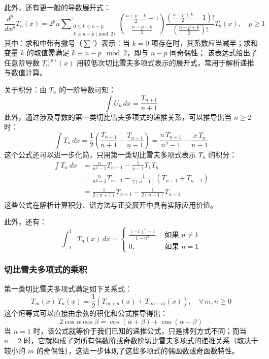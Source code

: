 此外，还有更一般的导数展开式：
$$
\frac{d^p}{dx^p} T_n(x) = 2^p n \sum\nolimits^{\prime}_{\substack{0 \leq k \leq n - p \\ k \equiv n - p \!\!\!\! \pmod{2}}}
\binom{\frac{n + p - k}{2} - 1}{\frac{n - p - k}{2}} \frac{\left( \frac{n + p + k}{2} - 1 \right)!}{\left( \frac{n - p + k}{2} \right)!} T_k(x) ,\quad p \geq 1~
$$
其中：求和中带有撇号（$\sum'$）表示：当 $k = 0$ 项存在时，其系数应当减半；求和变量 $k$ 的取值需满足 $k \equiv n - p \mod 2$，即与 $n - p$ 同奇偶性；
该表达式给出了任意阶导数 $T_n^{(p)}(x)$ 用较低次切比雪夫多项式表示的展开式，常用于解析递推与数值计算。

关于积分：由 $T_n$ 的一阶导数可知：
$$
\int U_n\, dx = \frac{T_{n+1}}{n+1}~
$$
此外，通过涉及导数的第一类切比雪夫多项式的递推关系，可以推导出当 $n \geq 2$ 时：
$$
\int T_n\, dx = \frac{1}{2} \left( \frac{T_{n+1}}{n+1} - \frac{T_{n-1}}{n-1} \right) = \frac{n\,T_{n+1}}{n^2 - 1} - \frac{x\,T_n}{n - 1}~
$$
这个公式还可以进一步化简，只用第一类切比雪夫多项式表示 $T_n$ 的积分：
$$
\begin{aligned}
\int T_n\, dx 
&= \frac{n}{n^2 - 1} T_{n+1} - \frac{1}{n - 1} T_1 T_n \\
&= \frac{n}{n^2 - 1} T_{n+1} - \frac{1}{2(n - 1)} (T_{n+1} + T_{n-1}) \\
&= \frac{1}{2(n + 1)} T_{n+1} - \frac{1}{2(n - 1)} T_{n-1}
\end{aligned}~
$$
这些公式在解析计算积分、谱方法与正交展开中具有实际应用价值。

此外，还有：
$$
\int_{-1}^{1} T_n(x)\, dx =
\begin{cases}
\displaystyle \frac{(-1)^n + 1}{1 - n^2}, & \text{如果 } n \neq 1 \\
0, & \text{如果 } n = 1
\end{cases}~
$$
\subsubsection{切比雪夫多项式的乘积}
第一类切比雪夫多项式满足如下关系式：
$$
T_m(x)\,T_n(x) = \frac{1}{2} \left( T_{m+n}(x) + T_{|m-n|}(x) \right), \quad \forall\, m, n \geq 0~
$$
这个恒等式可以直接由余弦的积化和公式推导得出：
$$
2\cos \alpha \cos \beta = \cos(\alpha + \beta) + \cos(\alpha - \beta)~
$$
当 $n = 1$ 时，该公式就等价于我们已知的递推公式，只是排列方式不同；而当 $n = 2$ 时，它就构成了对所有偶数阶或奇数阶切比雪夫多项式的递推关系（取决于较小的 $m$ 的奇偶性），这进一步体现了这些多项式的偶函数或奇函数特性。

